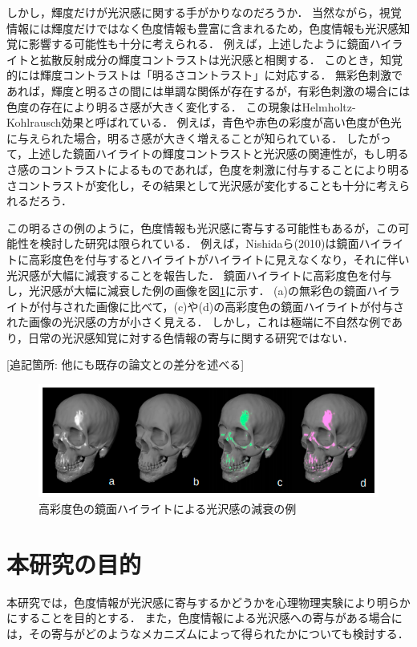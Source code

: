         しかし，輝度だけが光沢感に関する手がかりなのだろうか．
        当然ながら，視覚情報には輝度だけではなく色度情報も豊富に含まれるため，色度情報も光沢感知覚に影響する可能性も十分に考えられる．
        例えば，上述したように鏡面ハイライトと拡散反射成分の輝度コントラストは光沢感と相関する．
        このとき，知覚的には輝度コントラストは「明るさコントラスト」に対応する．
        無彩色刺激であれば，輝度と明るさの間には単調な関係が存在するが，有彩色刺激の場合には色度の存在により明るさ感が大きく変化する．
        この現象はHelmholtz-Kohlrausch効果と呼ばれている\cite{HKeffect}．
        例えば，青色や赤色の彩度が高い色度が色光に与えられた場合，明るさ感が大きく増えることが知られている．
        したがって，上述した鏡面ハイライトの輝度コントラストと光沢感の関連性が，もし明るさ感のコントラストによるものであれば，色度を刺激に付与することにより明るさコントラストが変化し，その結果として光沢感が変化することも十分に考えられるだろう．

        この明るさの例のように，色度情報も光沢感に寄与する可能性もあるが，この可能性を検討した研究は限られている．
        例えば，Nishidaら(2010)は鏡面ハイライトに高彩度色を付与するとハイライトがハイライトに見えなくなり，それに伴い光沢感が大幅に減衰することを報告した\cite{Nishida}．
        鏡面ハイライトに高彩度色を付与し，光沢感が大幅に減衰した例の画像を図\ref{SaturatedLowGloss}に示す．
        (a)の無彩色の鏡面ハイライトが付与された画像に比べて，(c)や(d)の高彩度色の鏡面ハイライトが付与された画像の光沢感の方が小さく見える．
        しかし，これは極端に不自然な例であり，日常の光沢感知覚に対する色情報の寄与に関する研究ではない．

        [追記箇所: 他にも既存の論文との差分を述べる]

        \begin{figure}[h]
            \centering
            \includegraphics[width=15.0cm]{./img/SaturatedLowGloss.png}
            \caption{高彩度色の鏡面ハイライトによる光沢感の減衰の例}
            \label{SaturatedLowGloss}
        \end{figure}


    \section{本研究の目的}
        本研究では，色度情報が光沢感に寄与するかどうかを心理物理実験により明らかにすることを目的とする．
        また，色度情報による光沢感への寄与がある場合には，その寄与がどのようなメカニズムによって得られたかについても検討する．

